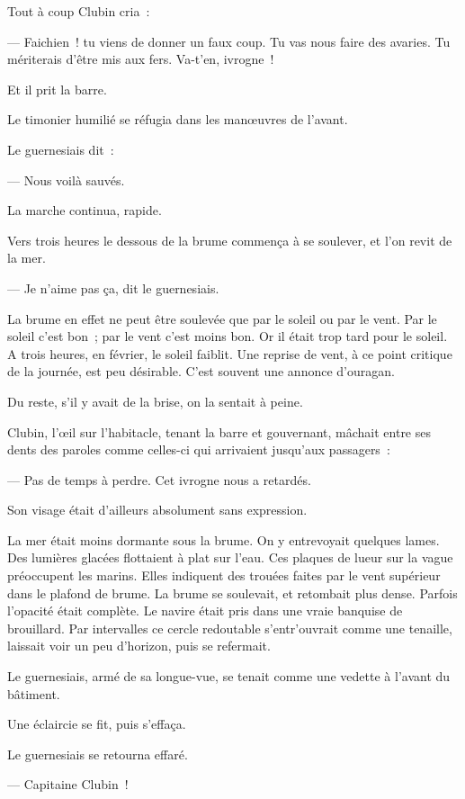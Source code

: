\documentclass[french,twoside]{book} %
\begin{document}
Tout à coup Clubin cria :\par
— Faichien ! tu viens de donner un faux coup. Tu vas nous faire des avaries. Tu mériterais d’être mis aux fers. Va-t’en, ivrogne !\par
Et il prit la barre.\par
Le timonier humilié se réfugia dans les manœuvres de l’avant.\par
Le guernesiais dit :\par
— Nous voilà sauvés.\par
La marche continua, rapide.\par
Vers trois heures le dessous de la brume commença à se soulever, et l’on revit de la mer.\par
— Je n’aime pas ça, dit le guernesiais.\par
La brume en effet ne peut être soulevée que par le soleil ou par le vent. Par le soleil c’est bon ; par le vent c’est moins bon. Or il était trop tard pour le soleil. A trois heures, en février, le soleil faiblit. Une reprise de vent, à ce point critique de la journée, est peu désirable. C’est souvent une annonce d’ouragan.\par
Du reste, s’il y avait de la brise, on la sentait à peine.\par
Clubin, l’œil sur l’habitacle, tenant la barre et gouvernant, mâchait entre ses dents des paroles comme celles-ci qui arrivaient jusqu’aux passagers :\par
— Pas de temps à perdre. Cet ivrogne nous a retardés.\par
 Son visage était d’ailleurs absolument sans expression.\par
La mer était moins dormante sous la brume. On y entrevoyait quelques lames. Des lumières glacées flottaient à plat sur l’eau. Ces plaques de lueur sur la vague préoccupent les marins. Elles indiquent des trouées faites par le vent supérieur dans le plafond de brume. La brume se soulevait, et retombait plus dense. Parfois l’opacité était complète. Le navire était pris dans une vraie banquise de brouillard. Par intervalles ce cercle redoutable s’entr’ouvrait comme une tenaille, laissait voir un peu d’horizon, puis se refermait.\par
Le guernesiais, armé de sa longue-vue, se tenait comme une vedette à l’avant du bâtiment.\par
Une éclaircie se fit, puis s’effaça.\par
Le guernesiais se retourna effaré.\par
— Capitaine Clubin !\par
\end{document}
